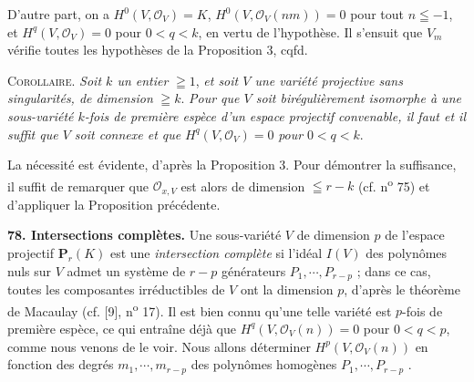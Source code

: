 %
%
%
D'autre part, on a $H^0(V, \mathcal{O}_V) = K$, $H^0(V, \mathcal{O}_V(nm)) = 0$ pour tout $n \leqq -1$, et $H^q(V, \mathcal{O}_V) = 0$ pour $0 < q < k$, en vertu de l'hypothèse. Il s'ensuit que $V_m$ vérifie toutes les hypothèses de la Proposition 3, cqfd.

\textsc{Corollaire}. \textit{Soit $k$ un entier} $\geqq 1$, \textit{et soit $V$ une variété projective sans singularités, de dimension} $\geqq k$. \textit{Pour que $V$ soit birégulièrement isomorphe à une sous-variété $k$-fois de première espèce d'un espace projectif convenable, il faut et il suffit que $V$ soit connexe et que} $H^q(V, \mathcal{O}_V) = 0$ \textit{pour} $0 < q < k$.

La nécessité est évidente, d'après la Proposition 3. Pour démontrer la suffisance, il suffit de remarquer que $\mathcal{O}_{x,V}$ est alors de dimension $\leqq r - k$ (cf. n\textsuperscript{o} 75) et d'appliquer la Proposition précédente.

\textbf{78. Intersections complètes.} Une sous-variété $V$ de dimension $p$ de l'espace projectif $\mathbf{P}_r(K)$ est une \textit{intersection complète} si l'idéal $I(V)$ des polynômes nuls sur $V$ admet un système de $r - p$ générateurs $P_1 , \cdots , P_{r-p}$ ; dans ce cas, toutes les composantes irréductibles de $V$ ont la dimension $p$, d'après le théorème de Macaulay (cf. [9], n\textsuperscript{o} 17). Il est bien connu qu'une telle variété est $p$-fois de première espèce, ce qui entraîne déjà que $H^q(V, \mathcal{O}_V(n)) = 0$ pour $0 < q < p$, comme nous venons de le voir. Nous allons déterminer $H^p(V, \mathcal{O}_V(n))$ en fonction des degrés $m_1 , \cdots , m_{r-p}$ des polynômes homogènes $P_1 , \cdots , P_{r-p}$ .

